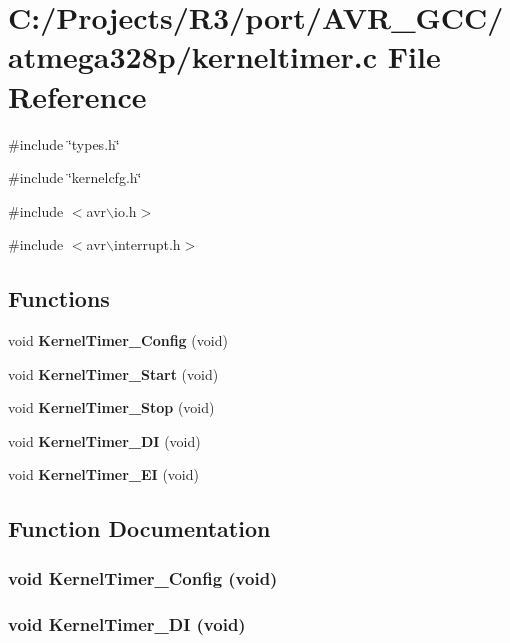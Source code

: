\section{C:/Projects/R3/port/AVR\_\-GCC/atmega328p/kerneltimer.c File Reference}
\label{kerneltimer_8c}
{\ttfamily \#include \char`\"{}types.h\char`\"{}}\par
{\ttfamily \#include \char`\"{}kernelcfg.h\char`\"{}}\par
{\ttfamily \#include $<$avr$\backslash$io.h$>$}\par
{\ttfamily \#include $<$avr$\backslash$interrupt.h$>$}\par
\subsection*{Functions}
\begin{DoxyCompactItemize}
\item 
void {\bf KernelTimer\_\-Config} (void)
\item 
void {\bf KernelTimer\_\-Start} (void)
\item 
void {\bf KernelTimer\_\-Stop} (void)
\item 
void {\bf KernelTimer\_\-DI} (void)
\item 
void {\bf KernelTimer\_\-EI} (void)
\end{DoxyCompactItemize}


\subsection{Function Documentation}
\subsubsection[{KernelTimer\_\-Config}]{\setlength{\rightskip}{0pt plus 5cm}void KernelTimer\_\-Config (void)}\label{kerneltimer_8c_a1ad5564e66f6ab929f251cd32a82181b}
\subsubsection[{KernelTimer\_\-DI}]{\setlength{\rightskip}{0pt plus 5cm}void KernelTimer\_\-DI (void)}\label{kerneltimer_8c_a5f111ce23b774ac7d736c8cae0034487}
